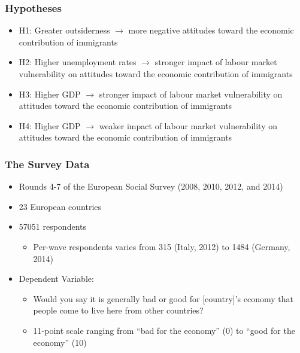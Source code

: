 \documentclass[14pt]{beamer}
\begin{document}
\begin{frame}
	\frametitle{Hypotheses}
	\begin{itemize}
		\item H1: Greater outsiderness $\rightarrow$ more negative attitudes toward the economic contribution of immigrants 
		\pause
		\item H2: Higher unemployment rates $\rightarrow$ stronger impact of labour market vulnerability on attitudes toward the economic contribution of immigrants 
		\pause
		\item H3: Higher GDP $\rightarrow$ stronger impact of labour market vulnerability on attitudes toward the economic contribution of immigrants 
		\pause
		\item H4: Higher GDP $\rightarrow$ weaker impact of labour market vulnerability on attitudes toward the economic contribution of immigrants 
	\end{itemize}
\end{frame}

\begin{frame}
	\frametitle{The Survey Data}
	\begin{itemize}
		\item Rounds 4-7 of the European Social Survey (2008, 2010, 2012, and 2014)
		\pause
		\item 23 European countries
		\pause
		\item 57051 respondents 
		\begin{itemize}
			\pause
			\item Per-wave respondents varies from 315 (Italy, 2012) to 1484 (Germany, 2014)
		\end{itemize}
		\pause
		\item Dependent Variable:
		\begin{itemize}
			\pause
			\item Would you say it is generally bad or good for [country]’s economy that people come to live here from other countries?
			\pause
			\item 11-point scale ranging from ``bad for the economy'' (0) to ``good for the economy'' (10)
		\end{itemize}
	\end{itemize}
\end{frame}
\end{document}
